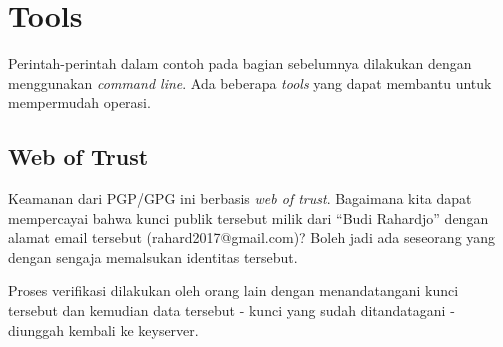 \section{Tools}
Perintah-perintah dalam contoh pada bagian sebelumnya dilakukan dengan
menggunakan {\em command line}. Ada beberapa {\em tools} yang dapat membantu
untuk mempermudah operasi.


\subsection{Web of Trust}
Keamanan dari PGP/GPG ini berbasis {\em web of trust}. Bagaimana kita dapat
mempercayai bahwa kunci publik tersebut milik dari ``Budi Rahardjo'' dengan
alamat email tersebut (rahard2017@gmail.com)? Boleh jadi ada seseorang yang
dengan sengaja memalsukan identitas tersebut. 

Proses verifikasi dilakukan oleh orang lain dengan menandatangani kunci
tersebut dan kemudian data tersebut - kunci yang sudah ditandatagani - diunggah
kembali ke keyserver. 
